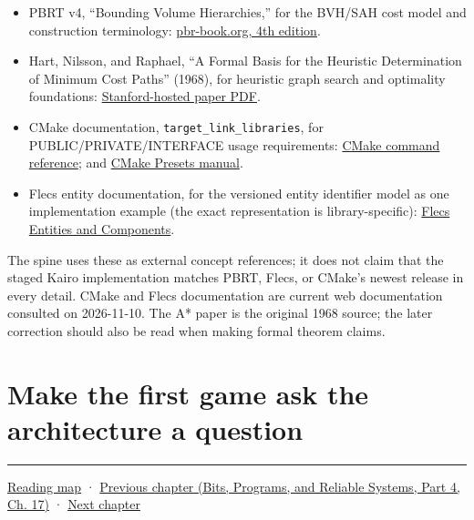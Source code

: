 \begin{itemize}
\tightlist
\item
  PBRT v4, ``Bounding Volume Hierarchies,'' for the BVH/SAH cost model and construction terminology: \href{https://www.pbr-book.org/4ed/Primitives_and_Intersection_Acceleration/Bounding_Volume_Hierarchies}{pbr-book.org, 4th edition}.
\item
  Hart, Nilsson, and Raphael, ``A Formal Basis for the Heuristic Determination of Minimum Cost Paths'' (1968), for heuristic graph search and optimality foundations: \href{https://ai.stanford.edu/~nilsson/OnlinePubs-Nils/PublishedPapers/astar.pdf}{Stanford-hosted paper PDF}.
\item
  CMake documentation, \texttt{target\_link\_libraries}, for PUBLIC/PRIVATE/INTERFACE usage requirements: \href{https://cmake.org/cmake/help/latest/command/target_link_libraries.html}{CMake command reference}; and \href{https://cmake.org/cmake/help/latest/manual/cmake-presets.7.html}{CMake Presets manual}.
\item
  Flecs entity documentation, for the versioned entity identifier model as one implementation example (the exact representation is library-specific): \href{https://www.flecs.dev/flecs/EntitiesComponents.html}{Flecs Entities and Components}.
\end{itemize}

The spine uses these as external concept references; it does not claim that the staged Kairo implementation matches PBRT, Flecs, or CMake's newest release in every detail. CMake and Flecs documentation are current web documentation consulted on 2026-11-10. The A* paper is the original 1968 source; the later correction should also be read when making formal theorem claims.

\section{Make the first game ask the architecture a question}\label{05-engine-i-ch008-make-the-first-game-ask-the-architecture-a-question}

\hypertarget{05-engine-i-ch008-make-the-first-game-ask-the-architecture-a-question}{}

\begin{center}\rule{0.5\linewidth}{0.5pt}\end{center}

\hyperref[volume-reading-map]{Reading map} · \href{../01-Bits-Programs-and-Reliable-Systems-P04/main.pdf\#nameddest=05-engine-i-ch007-typed-apis-and-measured-cpu-data-structures}{Previous chapter (Bits, Programs, and Reliable Systems, Part 4, Ch. 17)} · \hyperref[05-engine-i-ch009-player-choices-rules-and-readable-feedback]{Next chapter}

